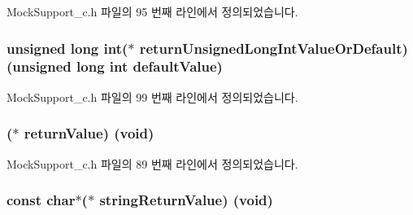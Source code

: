 Mock\+Support\+\_\+c.\+h 파일의 95 번째 라인에서 정의되었습니다.

\subsubsection[{\texorpdfstring{return\+Unsigned\+Long\+Int\+Value\+Or\+Default}{returnUnsignedLongIntValueOrDefault}}]{\setlength{\rightskip}{0pt plus 5cm}unsigned long int($\ast$ return\+Unsigned\+Long\+Int\+Value\+Or\+Default) (unsigned long int default\+Value)}\hypertarget{struct_s_mock_actual_call__c_aeb93f4fd4eedf7c83d4bdf04eab48e3c}{}\label{struct_s_mock_actual_call__c_aeb93f4fd4eedf7c83d4bdf04eab48e3c}


Mock\+Support\+\_\+c.\+h 파일의 99 번째 라인에서 정의되었습니다.

\subsubsection[{\texorpdfstring{return\+Value}{returnValue}}]{($\ast$ return\+Value) (void)}\hypertarget{struct_s_mock_actual_call__c_ab6bd7926fedfdf87c2a7ac71a1ff6a7c}{}\label{struct_s_mock_actual_call__c_ab6bd7926fedfdf87c2a7ac71a1ff6a7c}


Mock\+Support\+\_\+c.\+h 파일의 89 번째 라인에서 정의되었습니다.

\subsubsection[{\texorpdfstring{string\+Return\+Value}{stringReturnValue}}]{\setlength{\rightskip}{0pt plus 5cm}const char$\ast$($\ast$ string\+Return\+Value) (void)}\hypertarget{struct_s_mock_actual_call__c_aefdb35b7b60e7b4cbbc8205661f8ecae}{}\label{struct_s_mock_actual_call__c_aefdb35b7b60e7b4cbbc8205661f8ecae}


